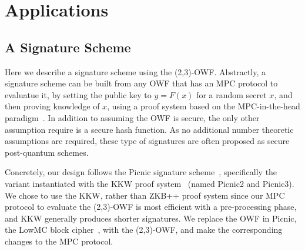
\newcommand{\aux}{\textsf{aux}}
\newcommand{\seed}{\textsf{seed}}
\newcommand{\msgs}{\textsf{msgs}}
\newcommand{\algcomment}[1]{{\color{Gray}{\qquad//#1}}}

\section{Applications}
\label{sec:applications}

\subsection{A Signature Scheme}
Here we describe a signature scheme using the (2,3)-OWF.  Abstractly, a
signature scheme can be built from any OWF that has an MPC protocol to
evaluatue it, by setting the public key to $y = F(x)$ for a random secret $x$,
and then proving knowledge of $x$, using a proof system based on the
MPC-in-the-head paradigm~\cite{STOC:IKOS07}.  In addition to assuming the OWF is
secure, the only other assumption require is a secure hash function. As 
no additional number theoretic assumptions are required, these type of signatures are
often proposed as secure post-quantum schemes. 

Concretely, our design follows the Picnic signature scheme~\cite{CCS:CDGORR17},
specifically the variant instantiated with the KKW proof
system~\cite{CCS:KatKolWan18} (named Picnic2 and Picnic3).  We chose to use the
KKW, rather than ZKB++ proof system since our MPC protocol to evaluate the
(2,3)-OWF is most efficient with a pre-processing phase, and KKW generally
produces shorter signatures.  We replace the OWF in Picnic, the LowMC block cipher~\cite{EC:ARSTZ15}, 
with the (2,3)-OWF, and make the corresponding changes to the MPC protocol. 



